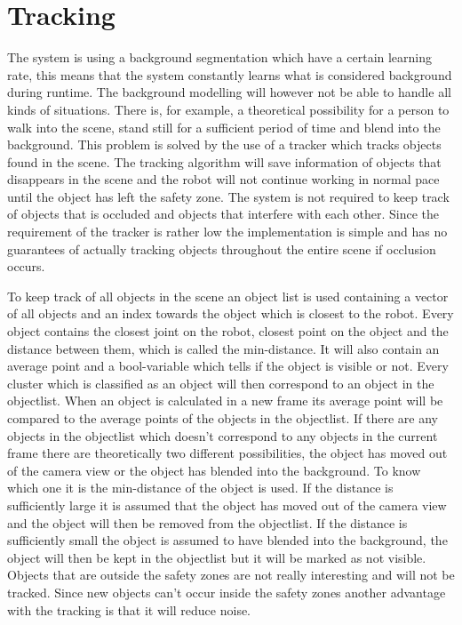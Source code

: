 
\section{Tracking}
The system is using a background segmentation which have a certain learning rate, this means that the system constantly learns what is considered background during runtime. The background modelling will however not be able to handle all kinds of situations. There is, for example, a theoretical possibility for a person to walk into the scene, stand still for a sufficient period of time and blend into the background. This problem is solved by the use of a tracker which tracks objects found in the scene. The tracking algorithm will save information of objects that disappears in the scene and the robot will not continue working in normal pace until the object has left the safety zone. The system is not required to keep track of objects that is occluded and objects that interfere with each other. Since the requirement of the tracker is rather low the implementation is simple and has no guarantees of actually tracking objects throughout the entire scene if occlusion occurs.

To keep track of all objects in the scene an object list is used containing a vector of all objects and an index towards the object which is closest to the robot. Every object contains the closest joint on the robot, closest point on the object and the distance between them, which is called the min-distance. It will also contain an average point and a bool-variable which tells if the object is visible or not.  Every cluster which is classified as an object will then correspond to an object in the objectlist. When an object is calculated in a new frame its average point will be compared to the average points of the objects in the objectlist. If there are any objects in the objectlist which doesn’t correspond to any objects in the current frame there are theoretically two different possibilities, the object has moved out of the camera view or the object has blended into the background. To know which one it is the min-distance of the object is used. If the distance is sufficiently large it is assumed that the object has moved out of the camera view and the object will then be removed from the objectlist. If the distance is sufficiently small the object is assumed to have blended into the background, the object will then be kept in the objectlist but it will be marked as not visible. Objects that are outside the safety zones are not really interesting and will not be tracked. Since new objects can’t occur inside the safety zones another advantage with the tracking is that it will reduce noise.

